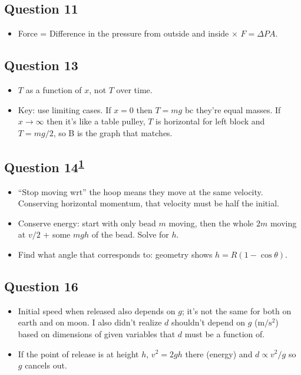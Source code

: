 \documentclass[11pt]{article}
\begin{document}
\subsection*{Question 11}
\begin{itemize}[leftmargin=*]
\item Force = Difference in the pressure from outside and inside $\times$  $F=\Delta PA$.
\end{itemize}

\subsection*{Question 13}
\begin{itemize}[leftmargin=*]
\item $T$ as a function of $x$, not $T$ over time.
\item Key: use limiting cases. If $x=0$ then $T=mg$ bc they're equal masses. If $x\to\infty$ then it's like a table pulley, $T$ is horizontal for left block and $T=mg/2$, so B is the graph that matches.
\end{itemize}

\subsection*{Question 14\textsuperscript{\textcolor{blue}{\href{https://math-gpt.org/video/hls_00eb09bd-45c9-4a77-aef1-9a6ecba4cbe7}{1}}}}
\begin{itemize}[leftmargin=*]
\item ``Stop moving wrt'' the hoop means they move at the same velocity. Conserving horizontal momentum, that velocity must be half the initial.
\item Conserve energy: start with only bead $m$ moving, then the whole $2m$ moving at $v/2$ + some $mgh$ of the bead. Solve for $h$.
\item Find what angle that corresponds to: geometry shows $h=R(1-\cos\theta)$.
\end{itemize}

\subsection*{Question 16}
\begin{itemize}[leftmargin=*]
\item Initial speed when released also depends on $g$; it's not the same for both on earth and on moon. I also didn't realize $d$ shouldn't depend on $g$ ($\text{m}/\text{s}^2$) based on dimensions of given variables that $d$ must be a function of.
\item If the point of release is at height $h$, $v^2=2gh$ there (energy) and $d \propto v^2/g$ so $g$ cancels out.
\end{itemize}
\end{document}
